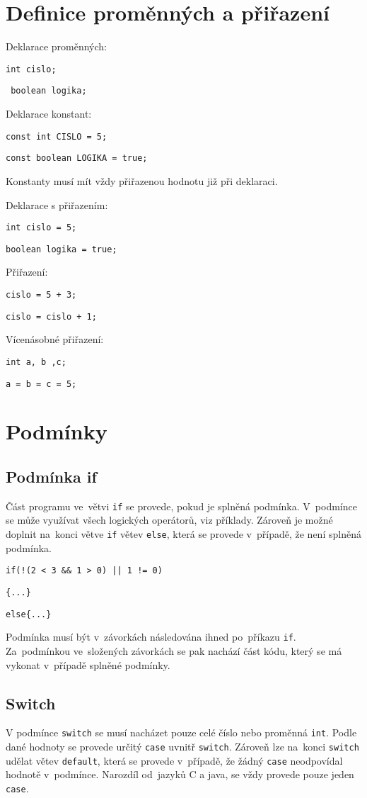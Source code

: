 \documentclass[czech]{thesiskiv}
\begin{document}
\section{Definice proměnných a přiřazení}

Deklarace proměnných:

\texttt{int cislo;}

\texttt{
boolean logika;}

\noindent Deklarace konstant:

\texttt{const int CISLO = 5;}

\texttt{const boolean LOGIKA = true;}

\noindent Konstanty musí mít vždy přiřazenou hodnotu již při deklaraci.

\noindent Deklarace s přiřazením: 

\texttt{int cislo = 5;}

\texttt{boolean logika = true;}

\noindent Přiřazení:

\texttt{cislo = 5 + 3;}

\texttt{cislo = cislo + 1;}

\noindent Vícenásobné přiřazení:

\texttt{int a, b ,c;}

\texttt{a = b = c = 5;}

\section{Podmínky}
\subsection{Podmínka if}
Část programu ve~větvi \texttt{if} se provede, pokud je splněná podmínka.
V~podmínce se může využívat všech logických operátorů, viz příklady.
Zároveň je možné doplnit na~konci větve \texttt{if} větev \texttt{else}, která 
se provede v~případě, že není splněná podmínka.


\texttt{if(!(2 < 3 \&\& 1 > 0) || 1 != 0)} 

\texttt{\{...\}}

\texttt{else\{...\} }

\noindent Podmínka musí být v~závorkách následována ihned po~příkazu \texttt{if}.
Za~podmínkou ve~složených závorkách se pak nachází část kódu, který se má vykonat v~případě splněné podmínky.

\subsection{Switch}
V podmínce \texttt{switch} se musí nacházet pouze celé číslo nebo proměnná  \texttt{int}.
Podle dané hodnoty se provede určitý \texttt{case} uvnitř \texttt{switch}.
Zároveň lze na~konci \texttt{switch} udělat větev \texttt{default}, která 
se provede v~případě, že žádný \texttt{case} neodpovídal hodnotě v~podmínce.
Narozdíl od~jazyků C a java, se vždy provede pouze jeden \texttt{case}.
\end{document}
